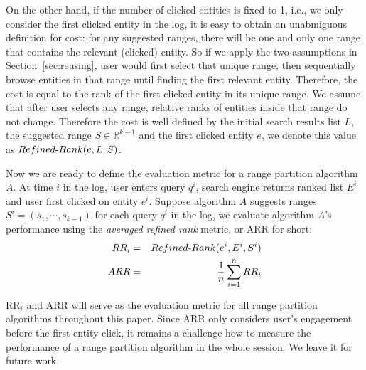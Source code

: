 On the other hand, if the number of clicked entities is fixed to 1, i.e., we only consider the first clicked entity in the log, it is easy to obtain an unabmiguous definition for cost: for any suggested ranges, there will be one and only one range that contains the relevant (clicked) entity. So if we apply the two assumptions in Section~\ref{sec:reusing}, user would first select that unique range, then sequentially browse entities in that range until finding the first relevant entity. Therefore, the cost is equal to the rank of the first clicked entity in its unique range. We assume that after user selects any range, relative ranks of entities inside that range do not change. Therefore the cost is well defined by the initial search results list $L$, the suggested range $S\in \mathbb{R}^{k-1}$ and the first clicked entity $e$, we denote this value as $\mathop{\mbox{$Refined$-$Rank$}}(e, L, S)$.

Now we are ready to define the evaluation metric for a range partition algorithm $A$. At time $i$ in the log, user enters query $q^i$, search engine returns ranked list $E^i$ and user first clicked on entity $e^i$. Suppose algorithm $A$ suggests ranges $S^i=(s_1, \cdots, s_{k-1})$ for each query $q^i$ in the log, we evaluate algorithm $A$'s performance using the \emph{averaged refined rank} metric, or ARR for short:
\vspace{-0.02in}
\begin{eqnarray}
RR_i &=& \mathop{\mbox{$Refined$-$Rank$}}(e^i, E^i, S^i)\nonumber\\
ARR &=& \frac{1}{n}\sum_{i=1}^n RR_i\label{eq:arr}
\end{eqnarray}

RR$_i$ and ARR will serve as the evaluation metric for all range partition algorithms throughout this paper. Since ARR only considers user's engagement before the first entity click, it remains a challenge how to measure the performance of a range partition algorithm in the whole session. We leave it for future work. 


